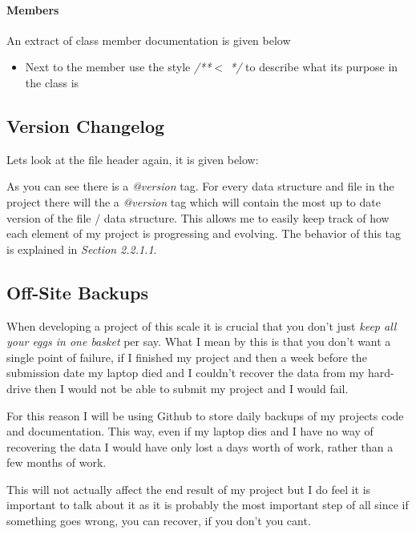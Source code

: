 \paragraph{Members}

An extract of class member documentation is given below



\begin{itemize}
\item{Next to the member use the style {\color{green} \textit{/**$<$  */} } to describe what its purpose in the class is}
\end{itemize}

\subsection{Version Changelog}

Lets look at the file header again, it is given below:



As you can see there is a {\color{green} \textit{@version}} tag. For every data structure and file in the project there will the a  {\color{green} \textit{@version}} tag which will contain the most up to date version of the file / data structure. This allows me to easily keep track of how each element of my project is progressing and evolving. The behavior of this tag is explained in \textit{Section 2.2.1.1}. 

\subsection{Off-Site Backups}

When developing a project of this scale it is crucial that you don't just \textit{keep all your eggs in one basket} per say. What I mean by this is that you don't want a single point of failure, if I finished my project and then a week before the submission date my laptop died and I couldn't recover the data from my hard-drive then I would not be able to submit my project and I would fail.

For this reason I will be using Github to store daily backups of my projects code and documentation. This way, even if my laptop dies and I have no way of recovering the data I would have only lost a days worth of work, rather than a few months of work. 

This will not actually affect the end result of my project but I do feel it is important to talk about it as it is probably the most important step of all since if something goes wrong, you can recover, if you don't you cant. 

